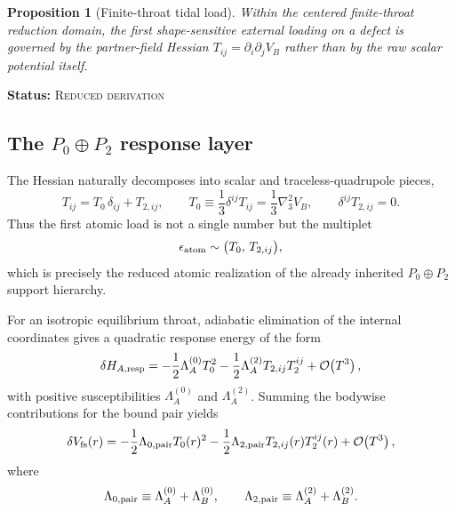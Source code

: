 \documentclass[11pt]{article}
\theoremstyle{plain}
\newtheorem{proposition}[theorem]{Proposition}
\theoremstyle{definition}
\theoremstyle{remark}
\newcommand{\statusReduced}{\textsc{Reduced derivation}}
\newcommand{\claimstatus}[1]{\par\smallskip\noindent\textbf{Status:} #1\par\smallskip}
\newcommand{\Order}[1]{\mathcal{O}\!\left(#1\right)}
\begin{document}
\begin{proposition}[Finite-throat tidal load]\label{prop:finite-throat-tidal-load}
Within the centered finite-throat reduction domain, the first shape-sensitive external loading on a defect is governed by the partner-field Hessian $T_{ij}=\partial_i\partial_jV_B$ rather than by the raw scalar potential itself.
\end{proposition}
\claimstatus{\statusReduced}

\subsection{The \texorpdfstring{$P_0\oplus P_2$}{P0+P2} response layer}\label{subsec:finite-p0-p2-layer}

The Hessian naturally decomposes into scalar and traceless-quadrupole pieces,
\begin{equation}
T_{ij}=T_0\,\delta_{ij}+T_{2,ij},
\qquad
T_0\equiv \frac13\delta^{ij}T_{ij}=\frac13\nabla_3^2V_B,
\qquad
\delta^{ij}T_{2,ij}=0.
\label{eq:finite-hessian-decomposition}
\end{equation}
Thus the first atomic load is not a single number but the multiplet
\begin{equation}
\epsilon_{\rm atom}\sim \bigl(T_0,\,T_{2,ij}\bigr),
\label{eq:finite-atomic-load-multiplet}
\end{equation}
which is precisely the reduced atomic realization of the already inherited \(P_0\oplus P_2\) support hierarchy.

For an isotropic equilibrium throat, adiabatic elimination of the internal coordinates gives a quadratic response energy of the form
\begin{equation}
\delta H_{A,\rm resp}
=
-\frac12\Lambda_A^{(0)}T_0^2
-\frac12\Lambda_A^{(2)}T_{2,ij}T_2^{ij}
+\Order{T^3},
\label{eq:finite-bodywise-response}
\end{equation}
with positive susceptibilities $\Lambda_A^{(0)}$ and $\Lambda_A^{(2)}$. Summing the bodywise contributions for the bound pair yields
\begin{equation}
\delta V_{\rm fs}(r)
=
-\frac12\Lambda_{0,\rm pair}T_0(r)^2
-\frac12\Lambda_{2,\rm pair}T_{2,ij}(r)T_2^{ij}(r)
+\Order{T^3},
\label{eq:finite-pair-response}
\end{equation}
where
\begin{equation}
\Lambda_{0,\rm pair}\equiv \Lambda_A^{(0)}+\Lambda_B^{(0)},
\qquad
\Lambda_{2,\rm pair}\equiv \Lambda_A^{(2)}+\Lambda_B^{(2)}.
\label{eq:finite-pair-susceptibilities}
\end{equation}
\end{document}

